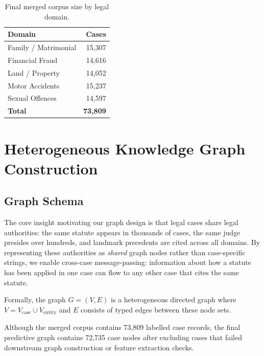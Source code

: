 \documentclass[12pt,a4paper]{report}
\begin{document}
\begin{table}[H]
  \centering
  \caption{Final merged corpus size by legal domain.}
  \label{tab:corpus_stats}
  \begin{tabular}{lr}
    \toprule
    \textbf{Domain} & \textbf{Cases} \\
    \midrule
    Family / Matrimonial & 15,307 \\
    Financial Fraud & 14,616 \\
    Land / Property & 14,052 \\
    Motor Accidents & 15,237 \\
    Sexual Offences & 14,597 \\
    \midrule
    \textbf{Total} & \textbf{73,809} \\
    \bottomrule
  \end{tabular}
\end{table}

\section{Heterogeneous Knowledge Graph Construction}
\label{sec:graph}

\subsection{Graph Schema}

The core insight motivating our graph design is that legal cases share legal authorities: the same statute appears in thousands of cases, the same judge presides over hundreds, and landmark precedents are cited across all domains. By representing these authorities as \textit{shared} graph nodes rather than case-specific strings, we enable cross-case message-passing: information about how a statute has been applied in one case can flow to any other case that cites the same statute.

Formally, the graph $G = (V, E)$ is a heterogeneous directed graph where $V = V_\text{case} \cup V_\text{entity}$ and $E$ consists of typed edges between these node sets.

Although the merged corpus contains 73,809 labelled case records, the final predictive graph contains 72,735 case nodes after excluding cases that failed downstream graph construction or feature extraction checks.
\end{document}
